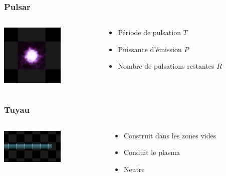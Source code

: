 \documentclass{beamer}
\begin{document}
\begin{frame}
	\frametitle{Pulsar}
    \begin{columns}[T]
        \begin{column}{.3\textwidth}
            \includegraphics[width=3cm]{pictures/pulsar}
        \end{column}
        \begin{column}{.7\textwidth}
            \begin{itemize}
                \item Période de pulsation $T$
                \item Puissance d'émission $P$
                \item Nombre de pulsations restantes $R$
            \end{itemize}
        \end{column}
    \end{columns}
\end{frame}

\begin{frame}
	\frametitle{Tuyau}
    \begin{columns}[T]
        \begin{column}{.3\textwidth}
            \includegraphics[width=3cm]{pictures/tuyau}
        \end{column}
        \begin{column}{.7\textwidth}
            \begin{itemize}
                \item Construit dans les zones vides
                \item Conduit le plasma
                \item Neutre
            \end{itemize}
        \end{column}
    \end{columns}
\end{frame}
\end{document}
